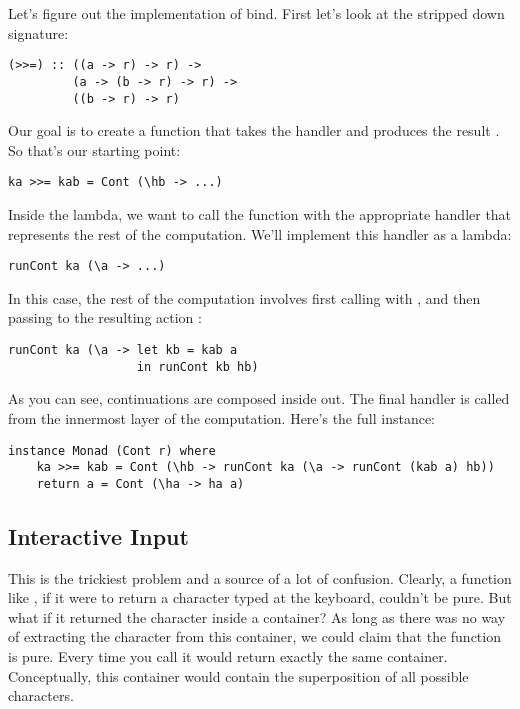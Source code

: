 Let's figure out the implementation of bind. First let's look at the
stripped down signature:

\begin{Verbatim}
(>>=) :: ((a -> r) -> r) ->
         (a -> (b -> r) -> r) ->
         ((b -> r) -> r)
\end{Verbatim}
Our goal is to create a function that takes the handler
 and produces the result . So
that's our starting point:

\begin{Verbatim}
ka >>= kab = Cont (\hb -> ...)
\end{Verbatim}
Inside the lambda, we want to call the function  with the
appropriate handler that represents the rest of the computation. We'll
implement this handler as a lambda:

\begin{Verbatim}
runCont ka (\a -> ...)
\end{Verbatim}
In this case, the rest of the computation involves first calling
 with , and then passing  to the
resulting action :

\begin{Verbatim}
runCont ka (\a -> let kb = kab a 
                  in runCont kb hb)
\end{Verbatim}
As you can see, continuations are composed inside out. The final handler
 is called from the innermost layer of the computation.
Here's the full instance:

\begin{Verbatim}
instance Monad (Cont r) where
    ka >>= kab = Cont (\hb -> runCont ka (\a -> runCont (kab a) hb))
    return a = Cont (\ha -> ha a)
\end{Verbatim}

\subsection{Interactive Input}

This is the trickiest problem and a source of a lot of confusion.
Clearly, a function like , if it were to return a
character typed at the keyboard, couldn't be pure. But what if it
returned the character inside a container? As long as there was no way
of extracting the character from this container, we could claim that the
function is pure. Every time you call  it would return
exactly the same container. Conceptually, this container would contain
the superposition of all possible characters.


